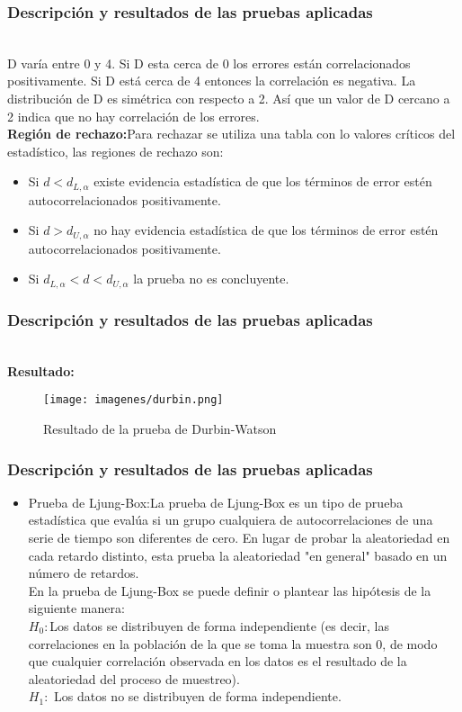 \documentclass[12pt]{beamer}
\begin{document}
\begin{frame}
\frametitle{Descripción y resultados de las pruebas aplicadas}
~\\D varía entre 0 y 4. Si D esta cerca de 0 los errores están correlacionados positivamente. Si D está cerca de 4 entonces la correlación es negativa.
La distribución de D es simétrica con respecto a 2. Así que un valor de D cercano a 2 indica que no hay correlación de los errores.
~\\ \textbf{Región de rechazo:}Para rechazar se utiliza una tabla con lo valores críticos del estadístico, las regiones de rechazo son:
\begin{itemize}
\item Si $d < d_{L,\alpha}$ existe evidencia estadística de que los términos de error estén autocorrelacionados positivamente.
\item Si $d > d_{U,\alpha}$ no hay evidencia estadística de que los términos de error estén autocorrelacionados positivamente.
\item Si $d_{L,\alpha} < d < d_{U,\alpha}$ la prueba no es concluyente.
\end{itemize}
\end{frame}

\begin{frame}
\frametitle{Descripción y resultados de las pruebas aplicadas}
~\\ \textbf{Resultado:}
\begin{figure}[!h]
    \begin{center}
        \texttt{[image: imagenes/durbin.png]}
        \caption{Resultado de la prueba de Durbin-Watson}
        \label{fig:Densidad}
    \end{center}
\end{figure}
\end{frame}

\begin{frame}
\frametitle{Descripción y resultados de las pruebas aplicadas}
\begin{itemize}
\item Prueba de Ljung-Box:La prueba de Ljung-Box es un tipo de prueba estadística que evalúa si un grupo cualquiera de autocorrelaciones de una serie de tiempo son diferentes de cero. En lugar de probar la aleatoriedad en cada retardo distinto, esta prueba la aleatoriedad "en general" basado en un número de retardos.
~\\En la prueba de Ljung-Box se puede definir o plantear las hipótesis de la siguiente manera:
~\\$H_{0}:$Los datos se distribuyen de forma independiente (es decir, las correlaciones en la población de la que se toma la muestra son 0, de modo que cualquier correlación observada en los datos es el resultado de la aleatoriedad del proceso de muestreo).
~\\$H_{1}:$ Los datos no se distribuyen de forma independiente.
\end{itemize}
\end{frame}
\end{document}
